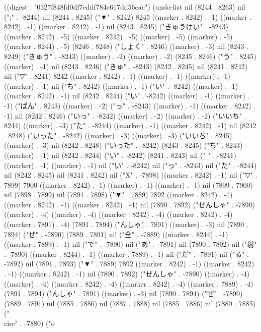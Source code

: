 
((digest . "0327f848fd0df7eddf784c617dd56cac") (undo-list nil (8244 . 8263) nil (";" . -8244) nil (8244 . 8245) ("▼" . 8242) 8245 ((marker . 8242) . -1) ((marker . 8242) . -1) ((marker . 8242) . -1) nil (8243 . 8245) ("きゅうけい" . -8243) ((marker . 8242) . -5) ((marker . 8242) . -5) ((marker) . -5) ((marker) . -5) ((marker . 8244) . -5) (8246 . 8248) ("しょく" . 8246) ((marker) . -3) nil (8243 . 8249) ("きゅう" . -8243) ((marker) . -2) ((marker) . -2) (8245 . 8246) ("う" . 8245) ((marker) . -1) nil (8243 . 8246) ("きゅ" . -8243) (8242 . 8245) nil (8241 . 8242) nil ("▽" . 8241) 8242 ((marker . 8242) . -1) ((marker) . -1) ((marker) . -1) ((marker) . -1) nil ("ち" . 8242) ((marker) . -1) ("い" . -8242) ((marker) . -1) ((marker . 8242) . -1) nil (8242 . 8244) ("い" . -8242) ((marker) . -1) ((marker) . -1) ("ぱん" . 8243) ((marker) . -2) ("っ" . -8243) ((marker) . -1) ((marker . 8242) . -1) nil (8242 . 8246) ("いっ" . -8242) ((marker) . -2) ((marker) . -2) ("いいち" . 8244) ((marker) . -3) ("た" . -8244) ((marker) . -1) ((marker . 8242) . -1) nil (8242 . 8248) ("いった" . -8242) ((marker) . -3) ((marker) . -3) ("いいち" . 8245) ((marker) . -3) nil (8242 . 8248) ("いった" . -8242) (8243 . 8245) ("ち" . 8243) ((marker) . -1) nil (8242 . 8244) ("い" . -8242) (8241 . 8243) nil ("
" . -8241) ((marker) . -1) ((marker) . -1) nil ("い" . -8242) nil ("っ" . -8243) nil ("た" . -8244) nil (8242 . 8245) nil (8241 . 8242) nil ("X" . -7898) ((marker . 8242) . -1) nil ("▽" . 7899) 7900 ((marker . 8242) . -1) ((marker) . -1) ((marker) . -1) nil (7899 . 7900) nil (7898 . 7899) nil (7891 . 7898) ("▼" . 7889) 7892 ((marker . 8242) . -1) ((marker . 8242) . -1) ((marker . 8242) . -1) nil (7890 . 7892) ("ぜんしゃ" . -7890) ((marker) . -4) ((marker) . -4) ((marker . 8242) . -4) ((marker . 8242) . -4) ((marker . 7891) . -4) (7891 . 7894) ("んしゃ" . 7891) ((marker) . -3) nil (7890 . 7894) ("ぜ" . -7890) (7889 . 7891) nil ("全" . -7889) ((marker . 8244) . -1) ((marker . 7889) . -1) nil ("で" . -7890) nil ("あ" . -7891) nil (7890 . 7892) nil ("射" . -7890) ((marker . 8244) . -1) ((marker . 7889) . -1) nil ("だ" . -7891) nil ("る" . -7892) nil (7891 . 7893) ("▼" . 7889) 7892 ((marker . 8242) . -1) ((marker . 8242) . -1) ((marker . 8242) . -1) nil (7890 . 7892) ("ぜんしゃ" . -7890) ((marker) . -4) ((marker) . -4) ((marker . 8242) . -4) ((marker . 8242) . -4) ((marker . 7889) . -4) (7891 . 7894) ("んしゃ" . 7891) ((marker) . -3) nil (7890 . 7894) ("ぜ" . -7890) (7889 . 7891) nil (7885 . 7886) nil (7887 . 7888) nil (7885 . 7886) nil (7880 . 7885) ("\\circ" . -7880) ("o
